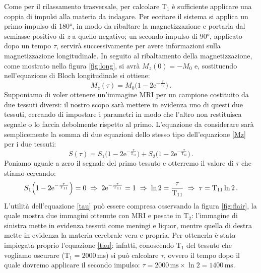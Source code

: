 \documentclass{report}
\newcommand{\figref}[1]{figura \ref{#1}}
\renewcommand{\eqref}[1]{equazione \ref{#1}}
\numberwithin{equation}{section}
\numberwithin{figure}{section}
\begin{document}
\noindent Come per il rilassamento trasversale, per calcolare $\mathrm{T_1}$ è sufficiente applicare una coppia di impulsi alla materia da indagare. Per eccitare il sistema si applica un primo impulso di 180°, in modo da ribaltare la magnetizzazione e portarla dal semiasse positivo di \textit{z} a quello negativo; un secondo impulso di 90°, applicato dopo un tempo $\tau$, servirà successivamente per avere informazioni sulla magnetizzazione longitudinale. In seguito al ribaltamento della magnetizzazione, come mostrato nella \figref{fig:long}, si avrà $M_z(0)=-M_0$ e, sostituendo nell'equazione di Bloch longitudinale si ottiene:
\begin{equation}
    M_z(\tau)=M_0 \Big(1-2\mathrm{e}^{-\frac{\tau}{\mathrm{T_1}}} \Big)\,.
    \label{Mz}
\end{equation}
Supponiamo di voler ottenere un'immagine MRI per un campione costituito da due tessuti diversi: il nostro scopo sarà mettere in evidenza uno di questi due tessuti, cercando di impostare i parametri in modo che l'altro non restituisca segnale o lo faccia debolmente rispetto al primo. L'equazione da considerare sarà semplicemente la somma di due equazioni dello stesso tipo dell'\eqref{Mz} per i due tessuti:
\begin{equation}
    S(\tau)=S_1 \Big(1-2\mathrm{e}^{-\frac{\tau}{\mathrm{T_{11}}}} \Big) + S_2 \Big(1-2\mathrm{e}^{-\frac{\tau}{\mathrm{T_{12}}}} \Big)\,.
\end{equation}
Poniamo uguale a zero il segnale del primo tessuto e otterremo il valore di $\tau$ che stiamo cercando:
\begin{equation}
    S_1 \Big(1-2\mathrm{e}^{-\frac{\tau}{\mathrm{T_{11}}}} \Big)=0 \hspace{3 pt} \Rightarrow \hspace{3 pt} 2\mathrm{e}^{-\frac{\tau}{\mathrm{T_{11}}}}=1 \hspace{3 pt} \Rightarrow \hspace{3 pt} \ln2=\frac{\tau}{\mathrm{T_{11}}} \hspace{3 pt} \Rightarrow \hspace{3 pt} \tau=\mathrm{T_{11}}\ln2\,.
    \label{tau}
\end{equation}
L'utilità dell'\eqref{tau} può essere compresa osservando la \figref{fig:flair}, la quale mostra due immagini ottenute con MRI e pesate in $\mathrm{T_2}$: l'immagine di sinistra mette in evidenza tessuti come meningi e liquor, mentre quella di destra mette in evidenza la materia cerebrale vera e propria. Per ottenerla è stata impiegata proprio l'\eqref{tau}: infatti, conoscendo $\mathrm{T_1}$ del tessuto che vogliamo oscurare ($\mathrm{T_1}=2000$\,ms) si può calcolare $\tau$, ovvero il tempo dopo il quale dovremo applicare il secondo impulso: $\tau = 2000\,\text{ms} \times \ln2 = 1400$\,ms.
\end{document}
